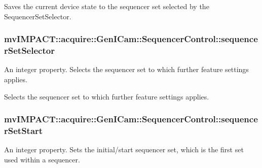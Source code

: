 Saves the current device state to the sequencer set selected by the Sequencer\+Set\+Selector. \hypertarget{classmv_i_m_p_a_c_t_1_1acquire_1_1_gen_i_cam_1_1_sequencer_control_a110c5e05d7b5f9e990b0ed2b1b8e423b}{
\subsubsection[{sequencer\+Set\+Selector}]{ mv\+I\+M\+P\+A\+C\+T\+::acquire\+::\+Gen\+I\+Cam\+::\+Sequencer\+Control\+::sequencer\+Set\+Selector}}\label{classmv_i_m_p_a_c_t_1_1acquire_1_1_gen_i_cam_1_1_sequencer_control_a110c5e05d7b5f9e990b0ed2b1b8e423b}


An integer property. Selects the sequencer set to which further feature settings applies. 

Selects the sequencer set to which further feature settings applies. \hypertarget{classmv_i_m_p_a_c_t_1_1acquire_1_1_gen_i_cam_1_1_sequencer_control_a4801f0f7996890b7cf3b1812fd8a93fb}{
\subsubsection[{sequencer\+Set\+Start}]{ mv\+I\+M\+P\+A\+C\+T\+::acquire\+::\+Gen\+I\+Cam\+::\+Sequencer\+Control\+::sequencer\+Set\+Start}}\label{classmv_i_m_p_a_c_t_1_1acquire_1_1_gen_i_cam_1_1_sequencer_control_a4801f0f7996890b7cf3b1812fd8a93fb}


An integer property. Sets the initial/start sequencer set, which is the first set used within a sequencer. 

